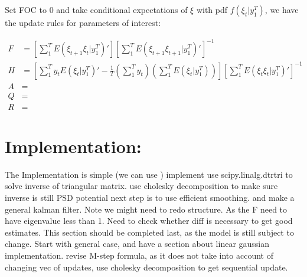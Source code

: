 \documentclass[12pt]{article}
\numberwithin{equation}{section}
\begin{document}
Set FOC to 0 and take conditional expectations of $\xi$ with pdf $f(\xi_t|y_1^T)$, we have the update rules for parameters of interest:

\begin{align}
    F &= \left[\sum_1^{T}E(\xi_{t+1}\xi_{t}|y_1^T)'\right] \left[\sum_1^{T}E(\xi_{t+1}\xi_{t+1}|y_1^T)'\right]^{-1} \\
    H &= \left[\sum_1^{T}y_tE(\xi_{t}|y_1^T)' - \frac{1}{T}\left(\sum_1^Ty_t\right)\left(\sum_1^TE(\xi_t|y_1^T)\right)\right] 
    \left[\sum_1^{T}E(\xi_{t}\xi_{t}|y_1^T)'\right]^{-1} \\
    A &= \\
    Q &= \\
    R &= 
\end{align}
\section{Implementation:} \label{sec:implement}
The Implementation is simple (we can use )
implement
use scipy.linalg.dtrtri to solve inverse of triangular matrix.
use cholesky decomposition to make sure inverse is still PSD
potential next step is to use efficient smoothing.
and make a general kalman filter. 
Note we might need to redo structure. As the F need to have eigenvalue less than 1. Need to check whether diff is necessary to get good estimates. This section should be completed last, as the model is still subject to change.
Start with general case, and have a section about linear gaussian implementation.
revise M-step formula, as it does not take into account of changing vec of updates, use cholesky decomposition to get sequential update. 
\end{document}
